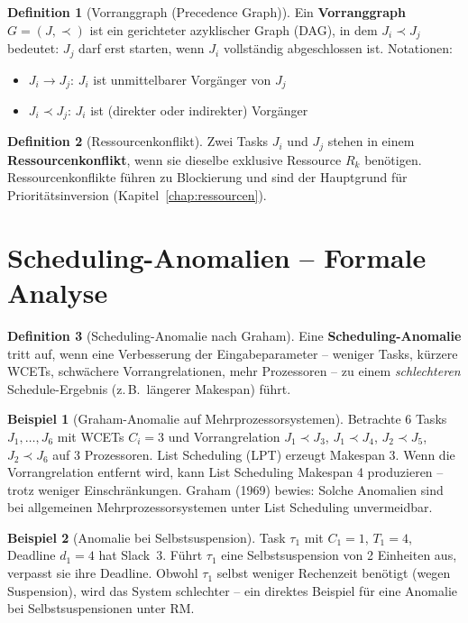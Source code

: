 ﻿\documentclass[a4paper,12pt]{report}
\theoremstyle{definition}
\newtheorem{definition}{Definition}[chapter]
\newtheorem{beispiel}{Beispiel}[chapter]
\begin{document}
\begin{definition}[Vorranggraph (Precedence Graph)]
	Ein \textbf{Vorranggraph} $G = (J, \prec)$ ist ein gerichteter azyklischer
	Graph (DAG), in dem $J_i \prec J_j$ bedeutet: $J_j$ darf erst starten,
	wenn $J_i$ vollständig abgeschlossen ist. Notationen:
	\begin{itemize}
		\item $J_i \to J_j$: $J_i$ ist unmittelbarer Vorgänger von $J_j$
		\item $J_i \prec J_j$: $J_i$ ist (direkter oder indirekter) Vorgänger
	\end{itemize}
\end{definition}

\begin{definition}[Ressourcenkonflikt]
	Zwei Tasks $J_i$ und $J_j$ stehen in einem \textbf{Ressourcenkonflikt},
	wenn sie dieselbe exklusive Ressource $R_k$ benötigen. Ressourcenkonflikte
	führen zu Blockierung und sind der Hauptgrund für Prioritätsinversion
	(Kapitel~\ref{chap:ressourcen}).
\end{definition}

\section{Scheduling-Anomalien -- Formale Analyse}

\begin{definition}[Scheduling-Anomalie nach Graham]
	Eine \textbf{Scheduling-Anomalie} tritt auf, wenn eine Verbesserung der
	Eingabeparameter -- weniger Tasks, kürzere WCETs, schwächere Vorrangrelationen,
	mehr Prozessoren -- zu einem \emph{schlechteren} Schedule-Ergebnis (z.\,B.\
	längerer Makespan) führt.
\end{definition}

\begin{beispiel}[Graham-Anomalie auf Mehrprozessorsystemen]
	Betrachte 6 Tasks $J_1,\ldots,J_6$ mit WCETs $C_i = 3$ und Vorrangrelation
	$J_1 \prec J_3$, $J_1 \prec J_4$, $J_2 \prec J_5$, $J_2 \prec J_6$ auf
	3 Prozessoren. List Scheduling (LPT) erzeugt Makespan 3. Wenn die Vorrangrelation
	entfernt wird, kann List Scheduling Makespan 4 produzieren -- trotz weniger
	Einschränkungen. Graham (1969) bewies: Solche Anomalien sind bei allgemeinen
	Mehrprozessorsystemen unter List Scheduling unvermeidbar.
\end{beispiel}

\begin{beispiel}[Anomalie bei Selbstsuspension]
	Task $\tau_1$ mit $C_1=1$, $T_1=4$, Deadline $d_1=4$ hat Slack~3. Führt
	$\tau_1$ eine Selbstsuspension von 2 Einheiten aus, verpasst sie ihre Deadline.
	Obwohl $\tau_1$ selbst weniger Rechenzeit benötigt (wegen Suspension), wird
	das System schlechter -- ein direktes Beispiel für eine Anomalie bei
	Selbstsuspensionen unter RM.
\end{beispiel}
\end{document}
